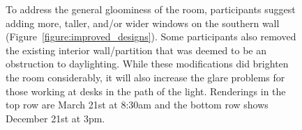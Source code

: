 \begin{figure}[t]
\vspace{1.7in}

\caption{To address the general gloominess of the room, participants
  suggest adding more, taller, and/or wider windows on the southern
  wall (Figure~\ref{figure:improved_designs}).  Some participants also
  removed the existing interior wall/partition that was deemed to be
  an obstruction to daylighting.  While these modifications did
  brighten the room considerably, it will also increase the glare
  problems for those working at desks in the path of the light.
  Renderings in the top row are March 21st at 8:30am and the bottom
  row shows December 21st at 3pm.}
\label{figure:brighter_renovations}

\vspace{-0.1in}
\end{figure}


